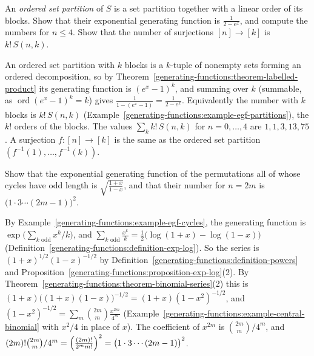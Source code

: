\begin{exercise}\label{generating-functions:exercise-ordered-partitions}
An \emph{ordered set partition} of $S$ is a set partition together with a linear order of its blocks. Show that their exponential generating function is $\frac{1}{2 - e^x}$, and compute the numbers
for $n \leq 4$. Show that the number of surjections $[n] \to [k]$ is $k!\,S(n, k)$.
\end{exercise}

\begin{solution}
An ordered set partition with $k$ blocks is a $k$-tuple of nonempty sets forming an ordered decomposition, so by Theorem~\ref{generating-functions:theorem-labelled-product} its generating function is
$(e^x - 1)^k$, and summing over $k$ (summable, as $\operatorname{ord}(e^x - 1)^k = k$) gives $\frac{1}{1 - (e^x - 1)} = \frac{1}{2 - e^x}$. Equivalently the number with $k$ blocks is $k!\,S(n, k)$
(Example~\ref{generating-functions:example-egf-partitions}), the $k!$ orders of the blocks. The values $\sum_kk!\,S(n, k)$ for $n = 0, \ldots, 4$ are $1, 1, 3, 13, 75$. A surjection $f \colon [n] \to [k]$ is
the same as the ordered set partition $(f^{-1}(1), \ldots, f^{-1}(k))$.
\end{solution}

\begin{exercise}\label{generating-functions:exercise-odd-cycles}
Show that the exponential generating function of the permutations all of whose cycles have odd length is $\sqrt{\frac{1 + x}{1 - x}}$, and that their number for $n = 2m$ is
$\bigl(1 \cdot 3 \cdots (2m - 1)\bigr)^2$.
\end{exercise}

\begin{solution}
By Example~\ref{generating-functions:example-egf-cycles}, the generating function is $\exp\bigl(\sum_{k \text{ odd}}x^k/k\bigr)$, and $\sum_{k \text{ odd}}\frac{x^k}{k} = \frac12\bigl(\log(1 + x) - \log(1 - x)\bigr)$
(Definition~\ref{generating-functions:definition-exp-log}). So the series is $(1 + x)^{1/2}(1 - x)^{-1/2}$ by Definition~\ref{generating-functions:definition-powers} and
Proposition~\ref{generating-functions:proposition-exp-log}(2). By Theorem~\ref{generating-functions:theorem-binomial-series}(2) this is $(1 + x)\bigl((1 + x)(1 - x)\bigr)^{-1/2} = (1 + x)(1 - x^2)^{-1/2}$,
and $(1 - x^2)^{-1/2} = \sum_m\binom{2m}{m}\frac{x^{2m}}{4^m}$ (Example~\ref{generating-functions:example-central-binomial} with $x^2/4$ in place of $x$). The coefficient of $x^{2m}$ is $\binom{2m}{m}/4^m$,
and $(2m)!\binom{2m}{m}/4^m = \Bigl(\frac{(2m)!}{2^mm!}\Bigr)^2 = \bigl(1 \cdot 3 \cdots (2m - 1)\bigr)^2$.
\end{solution}

